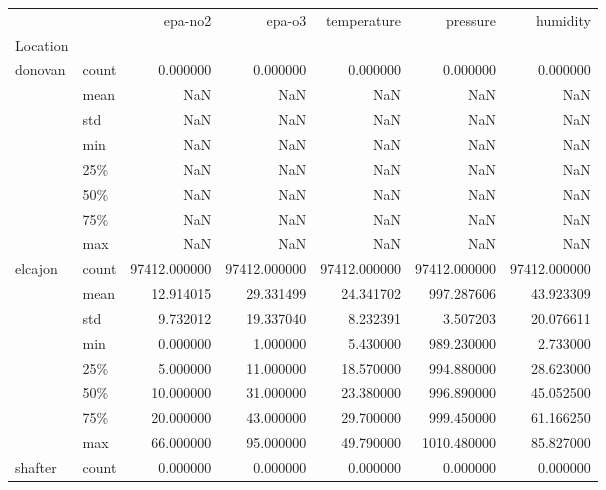 \begin{tabular}{llrrrrr}
\toprule
        &       &       epa-no2 &        epa-o3 &   temperature &      pressure &      humidity \\
Location & {} &               &               &               &               &               \\
\midrule
donovan & count &      0.000000 &      0.000000 &      0.000000 &      0.000000 &      0.000000 \\
        & mean &           NaN &           NaN &           NaN &           NaN &           NaN \\
        & std &           NaN &           NaN &           NaN &           NaN &           NaN \\
        & min &           NaN &           NaN &           NaN &           NaN &           NaN \\
        & 25\% &           NaN &           NaN &           NaN &           NaN &           NaN \\
        & 50\% &           NaN &           NaN &           NaN &           NaN &           NaN \\
        & 75\% &           NaN &           NaN &           NaN &           NaN &           NaN \\
        & max &           NaN &           NaN &           NaN &           NaN &           NaN \\
elcajon & count &  97412.000000 &  97412.000000 &  97412.000000 &  97412.000000 &  97412.000000 \\
        & mean &     12.914015 &     29.331499 &     24.341702 &    997.287606 &     43.923309 \\
        & std &      9.732012 &     19.337040 &      8.232391 &      3.507203 &     20.076611 \\
        & min &      0.000000 &      1.000000 &      5.430000 &    989.230000 &      2.733000 \\
        & 25\% &      5.000000 &     11.000000 &     18.570000 &    994.880000 &     28.623000 \\
        & 50\% &     10.000000 &     31.000000 &     23.380000 &    996.890000 &     45.052500 \\
        & 75\% &     20.000000 &     43.000000 &     29.700000 &    999.450000 &     61.166250 \\
        & max &     66.000000 &     95.000000 &     49.790000 &   1010.480000 &     85.827000 \\
shafter & count &      0.000000 &      0.000000 &      0.000000 &      0.000000 &      0.000000 \\

\end{tabular}
